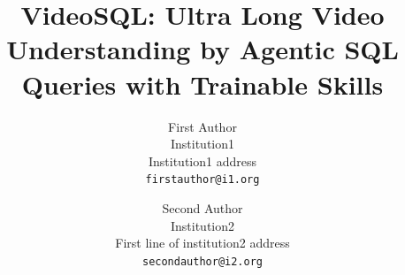 \documentclass[10pt,twocolumn,letterpaper]{article}
\title{VideoSQL: Ultra Long Video Understanding by Agentic SQL Queries with Trainable Skills}
\author{First Author\\
Institution1\\
Institution1 address\\
{\tt\small firstauthor@i1.org}
\and
Second Author\\
Institution2\\
First line of institution2 address\\
{\tt\small secondauthor@i2.org}
}
\begin{document}
\maketitle
% 





{
    \small
    
    
}

% 
\end{document}
